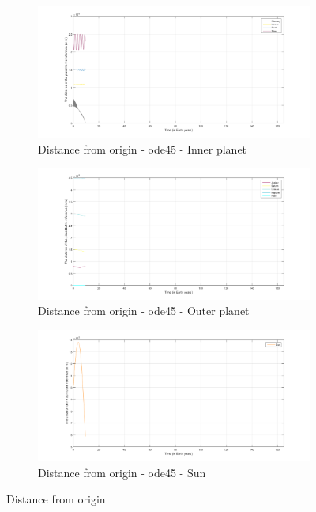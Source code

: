 \documentclass[a4paper]{article}
\begin{document}
\begin{figure}[H]
\centering
\begin{subfigure}{.5\textwidth}
\centering
\includegraphics[width=1\textwidth]{Solar_System_-_ode45_-_ip.png}
\caption{Distance from origin - ode45 - Inner planet}
\label{fig:Solar_System_-_ode45_-_ip}
\end{subfigure}%
\begin{subfigure}{.5\textwidth}
\centering
\includegraphics[width=1\textwidth]{Solar_System_-_ode45_-_op.png}
\caption{Distance from origin - ode45 - Outer planet}
\label{fig:Solar_System_-_ode45_-_op}
\end{subfigure}
\begin{subfigure}{.7\textwidth}
\centering
\includegraphics[width=1\textwidth]{Solar_System_-_ode45_-_sun.png}
\caption{Distance from origin - ode45 - Sun}
\label{fig:Solar_System_-_ode45_-_sun}
\end{subfigure} 
\caption{Distance from origin}
\label{fig:Solar_System_-_ode45_-_all}
\end{figure} 
\end{document}
